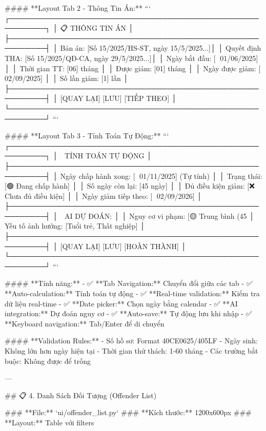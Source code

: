 #### **Layout Tab 2 - Thông Tin Án:**
```
┌─────────────────────────────────────────────────────────┐
│ 📋 THÔNG TIN ÁN                                       │
├─────────────────────────────────────────────────────────┤
│ Bản án:          [Số 15/2025/HS-ST, ngày 15/5/2025...]│
│ Quyết định THA:  [Số 15/2025/QĐ-CA, ngày 29/5/2025...]│
│ Ngày bắt đầu:    [📅 01/06/2025]                      │
│ Thời gian TT:    [06] tháng                           │
│ Được giảm:       [01] tháng                           │
│ Ngày được giảm:  [📅 02/09/2025]                      │
│ Số lần giảm:     [1] lần                              │
├─────────────────────────────────────────────────────────┤
│                    [QUAY LẠI] [LƯU] [TIẾP THEO]       │
└─────────────────────────────────────────────────────────┘
```

#### **Layout Tab 3 - Tính Toán Tự Động:**
```
┌─────────────────────────────────────────────────────────┐
│ 🧮 TÍNH TOÁN TỰ ĐỘNG                                  │
├─────────────────────────────────────────────────────────┤
│ Ngày chấp hành xong: [📅 01/11/2025] (Tự tính)       │
│ Trạng thái:           [🟢 Đang chấp hành]             │
│ Số ngày còn lại:      [45 ngày]                       │
│ Đủ điều kiện giảm:    [❌ Chưa đủ điều kiện]          │
│ Ngày giảm tiếp theo:  [📅 02/09/2026]                 │
├─────────────────────────────────────────────────────────┤
│ 🤖 AI DỰ ĐOÁN:                                        │
│ Nguy cơ vi phạm:      [🟡 Trung bình (45%
│ Yếu tố ảnh hưởng:     [Tuổi trẻ, Thất nghiệp]        │
├─────────────────────────────────────────────────────────┤
│                    [QUAY LẠI] [LƯU] [HOÀN THÀNH]      │
└─────────────────────────────────────────────────────────┘
```

#### **Tính năng:**
- ✅ **Tab Navigation:** Chuyển đổi giữa các tab
- ✅ **Auto-calculation:** Tính toán tự động
- ✅ **Real-time validation:** Kiểm tra dữ liệu real-time
- ✅ **Date picker:** Chọn ngày bằng calendar
- ✅ **AI integration:** Dự đoán nguy cơ
- ✅ **Auto-save:** Tự động lưu khi nhập
- ✅ **Keyboard navigation:** Tab/Enter để di chuyển

#### **Validation Rules:**
- Số hồ sơ: Format 40CE0625/405LF
- Ngày sinh: Không lớn hơn ngày hiện tại
- Thời gian thử thách: 1-60 tháng
- Các trường bắt buộc: Không được để trống

---

## 📋 4. Danh Sách Đối Tượng (Offender List)

### **File:** `ui/offender_list.py`
### **Kích thước:** 1200x600px
### **Layout:** Table với filters

